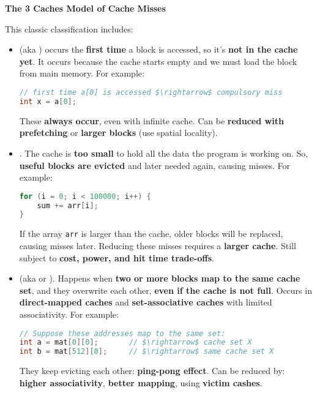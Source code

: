 \highspace
\begin{flushleft}
    \textcolor{Green3}{ \textbf{The 3 Caches Model of Cache Misses}}
\end{flushleft}
This classic classification includes:
\begin{itemize}
    \item {} (aka ) occurs the \textbf{first time} a block is accessed, so it's \textbf{not in the cache yet}. It occurs because the cache starts empty and we must load the block from main memory. For example:
    \begin{lstlisting}[language=C, mathescape=true]
// first time a[0] is accessed $\rightarrow$ compulsory miss
int x = a[0];\end{lstlisting}
    These \textbf{always occur}, even with infinite cache. Can be \textbf{reduced with prefetching} or \textbf{larger blocks} (use spatial locality).

    \item {}. The cache is \textbf{too small} to hold all the data the program is working on. So, \textbf{useful blocks are evicted} and later needed again, causing misses. For example:
    \begin{lstlisting}[language=C]
for (i = 0; i < 100000; i++) {
    sum += arr[i];
}\end{lstlisting}
    If the array \texttt{arr} is larger than the cache, older blocks will be replaced, causing misses later. Reducing these misses requires a \textbf{larger cache}. Still subject to \textbf{cost, power, and hit time trade-offs}.

    \item {} (aka  or ). Happens when \textbf{two or more blocks map to the same cache set}, and they overwrite each other, \textbf{even if the cache is not full}. Occurs in \textbf{direct-mapped caches} and \textbf{set-associative caches} with limited associativity. For example:
    \begin{lstlisting}[language=C, mathescape=true]
// Suppose these addresses map to the same set:
int a = mat[0][0];       // $\rightarrow$ cache set X
int b = mat[512][0];     // $\rightarrow$ same cache set X\end{lstlisting}
    They keep evicting each other: \textbf{ping-pong effect}. Can be reduced by: \textbf{higher associativity}, \textbf{better mapping}, using \textbf{victim cashes}.


\end{itemize}
